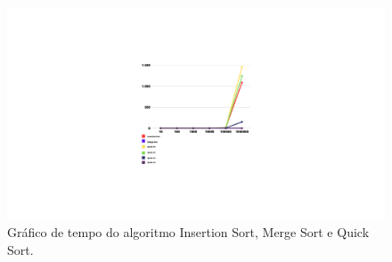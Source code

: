 \begin{figure}[H]
    \centering
    \includegraphics[width = 20cm]{Imagens/Quickx Sort/graficogeral.png}
    \caption{Gráfico de tempo do algoritmo Insertion Sort, Merge Sort e Quick Sort.}
    \label{fig:geralx1}
\end{figure}